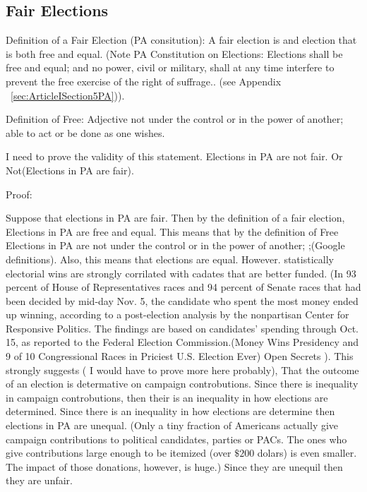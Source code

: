 \documentclass[11pt]{article} %
\begin{document}
\begin{enumerate}
\subsection{Fair Elections}

Definition of a Fair Election (PA consitution):  A fair election is and election that is both free and equal.   (Note PA Constitution on Elections: Elections shall be free and equal; and no power, civil or military, shall at any time interfere to prevent the free exercise of the right of suffrage.. (see Appendix ~\ref{sec:ArticleISection5PA})). 

Definition of Free: Adjective not under the control or in the power of another; able to act or be done as one wishes.

I need to prove the validity of this statement.  Elections in PA are not fair. Or Not(Elections in PA are fair).

Proof: 
%

Suppose that elections in PA are fair. Then  by the definition of a fair election, Elections in PA are free and equal. This means that by the definition of Free Elections in PA are not under the control or in the power of another; ;(Google definitions).   Also, this means that elections are equal.  However. statistically electorial wins are strongly corrilated with cadates that are better funded. (In 93 percent of House of Representatives races and 94 percent of Senate races that had been decided by mid-day Nov. 5, the candidate who spent the most money ended up winning, according to a post-election analysis by the nonpartisan Center for Responsive Politics. The findings are based on candidates' spending through Oct. 15, as reported to the Federal Election Commission.(Money Wins Presidency and 9 of 10 Congressional Races in Priciest U.S. Election Ever) Open Secrets ).  This strongly suggests ( I would have to prove more here probably), That the outcome of an election is determative on campaign controbutions.  Since there is inequality in campaign controbutions, then their is an inequality in how elections are determined. Since there is an inequality in how elections are determine then elections in PA are unequal.    (Only a tiny fraction of Americans actually give campaign contributions to political candidates, parties or PACs. The ones who give contributions large enough to be itemized (over $\$200$ dolars) is even smaller. The impact of those donations, however, is huge.)  Since they are unequil then they are unfair. 





\end{enumerate}
\end{document}
